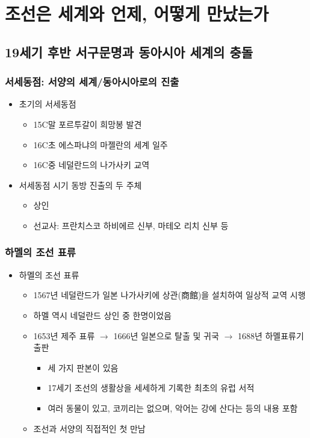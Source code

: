 \section{조선은 세계와 언제, 어떻게 만났는가}

\subsection{19세기 후반 서구문명과 동아시아 세계의 충돌}

\subsubsection*{서세동점: 서양의 세계/동아시아로의 진출}
\begin{itemize}
    \item 초기의 서세동점
    \begin{itemize}
        \item 15C말 포르투갈이 희망봉 발견
        \item 16C초 에스파냐의 마젤란의 세계 일주
        \item 16C중 네덜란드의 나가사키 교역
    \end{itemize}
    \item 서세동점 시기 동방 진출의 두 주체
    \begin{itemize}
        \item 상인
        \item 선교사: 프란치스코 하비에르 신부, 마테오 리치 신부 등
    \end{itemize}
\end{itemize}

\subsubsection*{하멜의 조선 표류}
\begin{itemize}
    \item 하멜의 조선 표류
    \begin{itemize}
        \item 1567년 네덜란드가 일본 나가사키에 상관(商館)을 설치하여 일상적 교역 시행
        \item 하멜 역시 네덜란드 상인 중 한명이었음
        \item 1653년 제주 표류 $\rightarrow$ 1666년 일본으로 탈출 및 귀국 $\rightarrow$ 1688년 하멜표류기 출판
        \begin{itemize}
            \item 세 가지 판본이 있음
            \item 17세기 조선의 생활상을 세세하게 기록한 최초의 유럽 서적
            \item 여러 동물이 있고, 코끼리는 없으며, 악어는 강에 산다는 등의 내용 포함
        \end{itemize}
        \item 조선과 서양의 직접적인 첫 만남
    \end{itemize}
\end{itemize}

